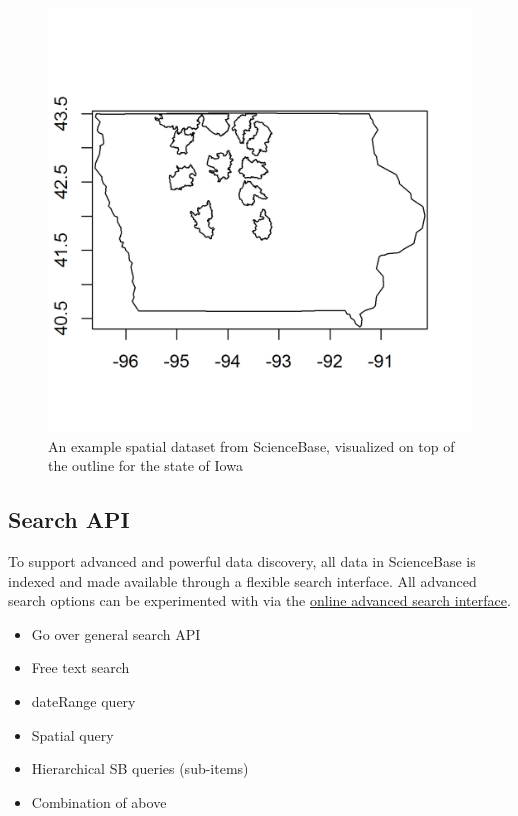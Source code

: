 \begin{figure}[htbp]
   \centering
   \includegraphics{mapfig}
   \caption{An example spatial dataset from ScienceBase, 
   visualized on top of the outline for the state of Iowa}
   \label{figure:iowafig}
 \end{figure}


\subsection{Search API}
To support advanced and powerful data discovery, all data 
in ScienceBase is indexed and made available through a flexible
search interface. All advanced search options can be experimented 
with via the  \href{https://www.sciencebase.gov/catalog/items/queryForm}{online advanced search interface}.


\begin{itemize}
	\item{Go over general search API}
	\item{Free text search}
	\item{dateRange query}
	\item{Spatial query}
	\item{Hierarchical SB queries (sub-items)}
	\item{Combination of above}
\end{itemize}

